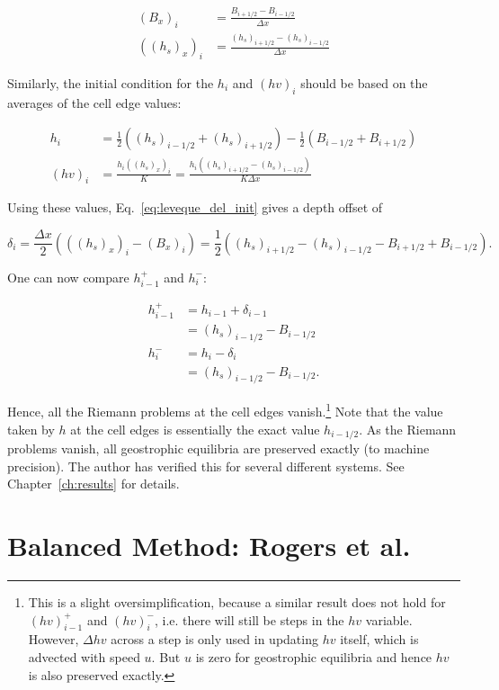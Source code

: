 \begin{align}
  (B_x)_i &= \frac{B_{i+1/2}-B_{i-1/2}}{\Delta x} \\
  ((h_s)_x)_i &= \frac{(h_s)_{i+1/2}-(h_s)_{i-1/2}}{\Delta x}
\end{align}

Similarly, the initial condition for the $h_i$ and $(hv)_i$ should be based on the averages of the cell edge values:

\begin{align}
  h_i &= \frac{1}{2}((h_s)_{i-1/2} + (h_s)_{i+1/2}) - \frac{1}{2}(B_{i-1/2} + B_{i+1/2}) \\
  (hv)_i &= \frac{h_i ((h_s)_x)_i}{K} = \frac{h_i ((h_s)_{i+1/2}-(h_s)_{i-1/2})}{K\Delta x}
\end{align}

Using these values, Eq.~\ref{eq:leveque_del_init} gives a depth offset of

\begin{equation}
  \delta_i = \frac{\Delta x}{2}(((h_s)_x)_i-(B_x)_i) = \frac{1}{2}((h_s)_{i+1/2}-(h_s)_{i-1/2}-B_{i+1/2}+B_{i-1/2}).
\end{equation}

One can now compare $h_{i-1}^+$ and $h_i^-$:

\begin{align}
  h_{i-1}^+ &= h_{i-1} + \delta_{i-1} \\
  &= (h_s)_{i-1/2} - B_{i-1/2} \\
  h_{i}^- &= h_{i} - \delta_{i} \\
  &= (h_s)_{i-1/2} - B_{i-1/2}.
\end{align}

Hence, all the Riemann problems at the cell edges vanish.\footnote{This is a slight oversimplification, because a similar result does not hold for $(hv)_{i-1}^+$ and $(hv)_i^-$, i.e. there will still be steps in the $hv$ variable. However, $\Delta hv$ across a step is only used in updating $hv$ itself, which is advected with speed $u$. But $u$ is zero for geostrophic equilibria and hence $hv$ is also preserved exactly.} Note that the value taken by $h$ at the cell edges is essentially the exact value $h_{i-1/2}$. As the Riemann problems vanish, all geostrophic equilibria are preserved exactly (to machine precision). The author has verified this for several different systems. See Chapter~\ref{ch:results} for details.

\section{Balanced Method: Rogers et al.}

